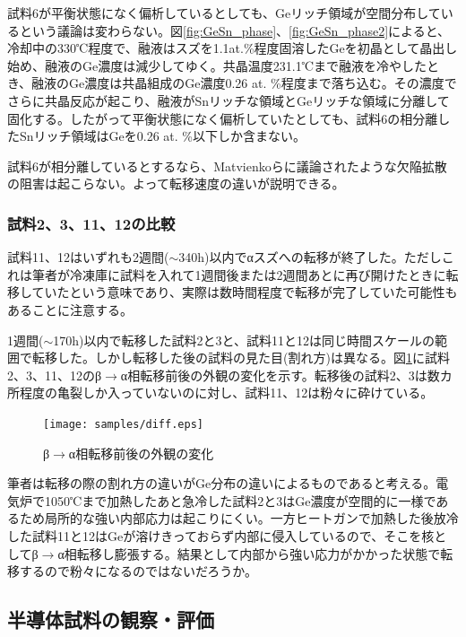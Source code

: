 試料6が平衡状態になく偏析しているとしても、Geリッチ領域が空間分布しているという議論は変わらない。図\ref{fig:GeSn_phase}、\ref{fig:GeSn_phase2}によると、冷却中の330℃程度で、融液はスズを1.1at.\%程度固溶したGeを初晶として晶出し始め、融液のGe濃度は減少してゆく。共晶温度231.1℃まで融液を冷やしたとき、融液のGe濃度は共晶組成のGe濃度0.26 at. \%程度\cite{Thurmond1960}まで落ち込む。その濃度でさらに共晶反応が起こり、融液がSnリッチな領域とGeリッチな領域に分離して固化する。したがって平衡状態になく偏析していたとしても、試料6の相分離したSnリッチ領域はGeを0.26 at. \%以下しか含まない。

試料6が相分離しているとするなら、Matvienkoら\cite{Matvienko}に議論されたような欠陥拡散の阻害は起こらない。よって転移速度の違いが説明できる。

\subsubsection{試料2、3、11、12の比較}
試料11、12はいずれも2週間($\sim$340h)以内でαスズへの転移が終了した。ただしこれは筆者が冷凍庫に試料を入れて1週間後または2週間あとに再び開けたときに転移していたという意味であり、実際は数時間程度で転移が完了していた可能性もあることに注意する。

1週間($\sim$170h)以内で転移した試料2と3と、試料11と12は同じ時間スケールの範囲で転移した。しかし転移した後の試料の見た目(割れ方)は異なる。図\ref{fig:diff}に試料2、3、11、12のβ$\to$α相転移前後の外観の変化を示す。転移後の試料2、3は数カ所程度の亀裂しか入っていないのに対し、試料11、12は粉々に砕けている。
\begin{figure}[!h]
    \begin{center}
   \texttt{[image: samples/diff.eps]}
  \end{center}
  \caption{β$\to$α相転移前後の外観の変化}
  \label{fig:diff}
\end{figure}

筆者は転移の際の割れ方の違いがGe分布の違いによるものであると考える。電気炉で1050℃まで加熱したあと急冷した試料2と3はGe濃度が空間的に一様であるため局所的な強い内部応力は起こりにくい。一方ヒートガンで加熱した後放冷した試料11と12はGeが溶けきっておらず内部に侵入しているので、そこを核としてβ$\to$α相転移し膨張する。結果として内部から強い応力がかかった状態で転移するので粉々になるのではないだろうか。

\subsection{半導体試料の観察・評価}

